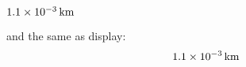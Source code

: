 \documentclass[review,number,sort&compress]{elsarticle}
\begin{document}
$\unit[1.1 \times 10^{-3}]{km}$

and the same as display:
\begin{displaymath}
\unit[1.1 \times 10^{-3}]{km}
\end{displaymath}
\end{document}
